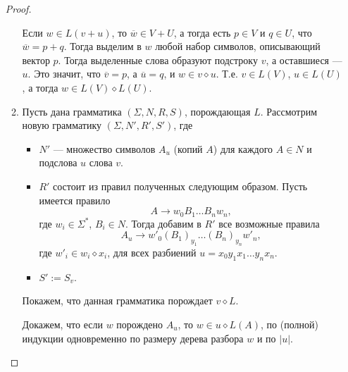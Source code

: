 \documentclass[12pt,a4paper]{article}
\begin{document}
\begin{problem}{8}
\begin{enumerate}
\begin{proof}
\begin{enumerate}
                            Если $w \in L(v + u)$, то $\overline{w} \in V + U$, а тогда есть $p \in V$ и $q \in U$, что $\overline{w} = p + q$. Тогда выделим в $w$ любой набор символов, описывающий вектор $p$. Тогда выделенные слова образуют подстроку $v$, а оставшиеся --- $u$. Это значит, что $\overline{v} = p$, а $\overline{u} = q$, и $w \in v \diamond u$. Т.е. $v \in L(V)$, $u \in L(U)$, а тогда $w \in L(V) \diamond L(U)$.
                        \item Пусть дана грамматика $(\Sigma, N, R, S)$, порождающая $L$. Рассмотрим новую грамматику $(\Sigma, N', R', S')$, где
                            \begin{itemize}
                                \item $N'$ --- множество символов $A_u$ (копий $A$) для каждого $A \in N$ и подслова $u$ слова $v$.
                                \item $R'$ состоит из правил полученных следующим образом. Пусть имеется правило
                                    \[A \to w_0 B_1 \dots B_n w_n,\]
                                    где $w_i \in \Sigma^*$, $B_i \in N$. Тогда добавим в $R'$ все возможные правила
                                    \[A_u \to w'_0 (B_1)_{y_1} \dots (B_n)_{y_n} w'_n,\]
                                    где $w'_i \in w_i \diamond x_i$, для всех разбиений $u = x_0 y_1 x_1 \dots y_n x_n$.
                                \item $S' := S_v$.
                            \end{itemize}
                            Покажем, что данная грамматика порождает $v \diamond L$.
        
                            Докажем, что если $w$ порождено $A_u$, то $w \in u \diamond L(A)$, по (полной) индукции одновременно по размеру дерева разбора $w$ и по $|u|$.
                            

\end{enumerate}
\end{proof}
\end{enumerate}
\end{problem}
\end{document}
